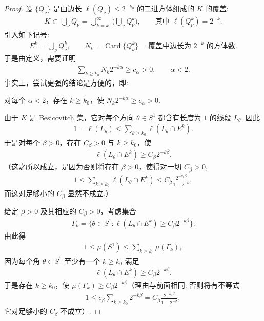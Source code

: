 \begin{proof}
设 $\{Q_\nu\}$ 是由边长 $\ell(Q_\nu) \leq 2^{-k_0}$ 的二进方体组成的 $K$ 的覆盖:
\begin{align*}
  K\subset\bigcup_{\nu}Q_{\nu}=\bigcup_{k=k_{0}}^{\infty}\Big(\bigcup_{\nu}Q_{\nu}^{k}\Big),\qquad
  \text{其中 } \ell(Q_{\nu}^{k})=2^{-k}.
\end{align*}
引入如下记号:
\begin{align*}
  E^{k}=\bigcup_{\nu}Q_{\nu}^{k},\qquad
  N_{k}=\operatorname{Card}\{Q_{\nu}^{k}\}=\text{覆盖中边长为 } 2^{-k} \text{ 的方体数}.
\end{align*}
于是由定义，需要证明
\begin{align*}
  \sum_{k\geq k_{0}}N_{k}2^{-k\alpha}\geq c_{\alpha}>0,\qquad \alpha<2.
\end{align*}
事实上，尝试更强的结论是方便的，即:

\begin{claim*}
对每个 $\alpha < 2$，存在 $k \geq k_0$，使 $N_k 2^{-k\alpha} \geq c_\alpha > 0$.
\end{claim*}

由于 $K$ 是 Besicovitch 集，它对每个方向 $\theta \in S^1$ 都含有长度为 $1$ 的线段 $L_\theta$. 因此
\begin{align*}
  1=\ell(L_{\theta})\leq\sum_{k\geq k_{0}}\ell(L_{\theta}\cap E^{k}).
\end{align*}
于是对每个 $\beta > 0$，存在 $C_{\beta} > 0$ 与 $k \geq k_{0}$，使
\begin{align*}
  \ell(L_{\theta}\cap E^{k})\geq C_{\beta}2^{-k\beta}.
\end{align*}
（这之所以成立，是因为否则将存在 $\beta > 0$，使得对一切 $C_\beta > 0$,
\begin{align*}
  1\leq\sum_{k\geq k_{0}}\ell(L_{\theta}\cap E^{k})\leq C_{\beta}\frac{2^{-k_{0}\beta}}{1-2^{-\beta}},
\end{align*}
而这对足够小的 $C_{\beta}$ 显然不成立.）

给定 $\beta > 0$ 及其相应的 $C_{\beta} > 0$，考虑集合
\begin{align*}
  \Gamma_{k}=\{\theta\in S^{1}:\ell(L_{\theta}\cap E^{k})\geq C_{\beta}2^{-k\beta}\}.
\end{align*}
由此得
\begin{align*}
  1\leq\mu(S^{1})\leq\sum_{k\geq k_{0}}\mu(\Gamma_{k}),
\end{align*}
因为每个角 $\theta \in S^1$ 至少有一个 $k \geq k_0$ 满足
\begin{align*}
  \ell(L_{\theta}\cap E^{k})\geq C_{\beta}2^{-k\beta}.
\end{align*}
于是存在 $k \geq k_0$，使 $\mu(\Gamma_k) \geq C_\beta 2^{-k\beta}$（理由与前面相同: 否则将有不等式
\begin{align*}
  1\leq c_{\beta}\sum_{k\geq k_{0}}2^{-k\beta}=C_{\beta}\frac{2^{-k_{0}\beta}}{1-2^{-\beta}},
\end{align*}
它对足够小的 $C_{\beta}$ 不成立）.


\end{proof}
